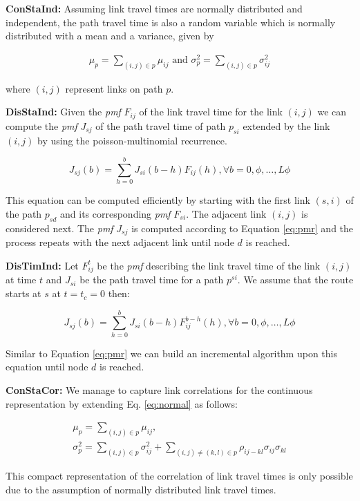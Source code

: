 \textbf{ConStaInd: }Assuming link travel times are normally distributed and independent, the path travel time is also a random variable which is normally distributed with a mean and a variance, given by

\begin{gather}
\label{eq:normal}
	\mu_{p} = \sum_{(i,j)\in p} \mu_{ij} \text{ and } \sigma_{p}^2 =
	\sum_{(i,j)\in p} \sigma_{ij}^2 
\end{gather}

where $(i,j)$ represent links on path $p$.

\textbf{DisStaInd: } Given the \textit{pmf} $F_{ij}$ of the link travel time for the link $(i,j)$ we can compute the \textit{pmf} $J_{sj}$ of the path travel time of path $p_{si}$ extended by the link $(i,j)$ by using the poisson-multinomial recurrence.

\begin{equation}
\label{eq:pmr}
	J_{sj}(b) = \sum_{h=0}^b J_{si}(b-h) F_{ij}(h)  , \forall b = 0, \phi,\ldots, L
	\phi
\end{equation}

This equation can be computed efficiently by starting with the first link $(s,i)$ of the path $p_{sd}$ and its corresponding \textit{pmf} $F_{si}$. The adjacent link $(i,j)$ is considered next. The \textit{pmf} $J_{sj}$ is computed according to Equation \ref{eq:pmr} and the process repeats with the next adjacent link until node $d$ is reached. 

\textbf{DisTimInd: } Let $F_{ij}^t$ be the \textit{pmf} describing the link travel time of the link $(i,j)$ at time $t$ and $J_{si}$ be the path travel time for a path $p^{si}$. We assume that the route starts at $s$ at $t = t_c = 0$ then:

\begin{equation}
\label{eq:pmr2}
	J_{sj}(b) = \sum_{h=0}^b J_{si}(b-h) F_{ij}^{b-h}(h)  , \forall b = 0,
	\phi,\ldots, L
	\phi
\end{equation}

Similar to Equation \ref{eq:pmr} we can build an incremental algorithm upon this equation until node $d$ is reached.

\textbf{ConStaCor: } We manage to capture link correlations for the continuous representation by extending Eq. \ref{eq:normal} as follows:

\begin{gather}
\label{eq:normal2}
	\mu_{p} = \sum_{(i,j)\in p} \mu_{ij}, \\
	\sigma_{p}^2 = \sum_{(i,j)\in p} \sigma_{ij}^2 +\sum_{(i,j)\neq(k,l)\in p}
	\rho_{ij-kl}
	\sigma_{ij} \sigma_{kl}
\end{gather}

This compact representation of the correlation of link travel times is only possible due to the assumption of normally distributed link travel times. 